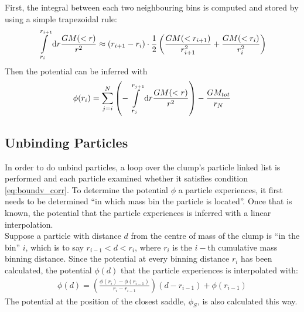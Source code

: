 First, the integral between each two neighbouring bins is computed and stored by using a simple trapezoidal rule:
%
\begin{equation}
	\int\limits_{r_i}^{r_{i+1}} \mathrm{d} r \frac{G M(<r)}{r^2} \approx (r_{i+1} - r_i ) \cdot \frac12 \left( \frac{G M(<r_{i+1})}{r_{i+1}^2} + \frac{G M(<r_{i})}{r_{i}^2}    \right)
\end{equation}
%
Then the potential can be inferred with
%
\begin{equation}
	\phi(r_i) = \sum\limits_{j=i}^{N} \left(-\int\limits_{r_j}^{r_{j+1}} \mathrm{d} r \frac{G M(<r)}{r^2} \right) - \frac{GM_{tot}}{r_{N}}
\end{equation}









\subsection{Unbinding Particles}

In order to do unbind particles, a loop over the clump's particle linked list is performed and each particle examined whether it satisfies condition \eqref{eq:boundv_corr}.
To determine the potential $\phi$ a particle experiences, it first needs to be determined ``in which mass bin the particle is located''.
Once that is known, the potential that the particle experiences is inferred with a linear interpolation. \\
%
Suppose a particle with distance $d$ from the centre of mass of the clump is ``in the bin'' $i$, which is to say $r_{i-1} < d < r_i$, where $r_i$ is the $i-$th cumulative mass binning distance.
Since the potential at every binning distance $r_i$ has been calculated, the potential $\phi(d)$ that the particle experiences is interpolated with:
%
\begin{align}
	\phi(d) = 	\left( \frac{ \phi(r_i) - \phi(r_{i-1})} {r_i - r_{i-1}}
				\right) (d - r_{i-1}) + \phi(r_{i-1})
\end{align}
%
The potential at the position of the closest saddle, $\phi_S$, is also calculated this way.\\


